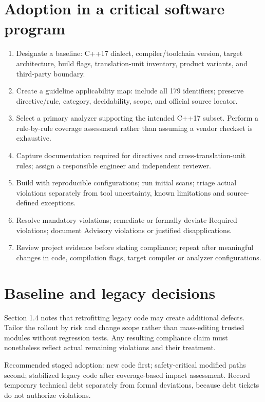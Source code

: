 \documentclass[10pt,letterpaper]{article}
\begin{document}
\section{Adoption in a critical software program}
\begin{enumerate}
\item Designate a baseline: C++17 dialect, compiler/toolchain version, target architecture, build flags, translation-unit inventory, product variants, and third-party boundary.
\item Create a guideline applicability map: include all 179 identifiers; preserve directive/rule, category, decidability, scope, and official source locator.
\item Select a primary analyzer supporting the intended C++17 subset. Perform a rule-by-rule coverage assessment rather than assuming a vendor checkset is exhaustive.
\item Capture documentation required for directives and cross-translation-unit rules; assign a responsible engineer and independent reviewer.
\item Build with reproducible configurations; run initial scans; triage actual violations separately from tool uncertainty, known limitations and source-defined exceptions.
\item Resolve mandatory violations; remediate or formally deviate Required violations; document Advisory violations or justified disapplications.
\item Review project evidence before stating compliance; repeat after meaningful changes in code, compilation flags, target compiler or analyzer configurations.
\end{enumerate}

\section{Baseline and legacy decisions}
Section 1.4 notes that retrofitting legacy code may create additional defects. Tailor the rollout by risk and change scope rather than mass-editing trusted modules without regression tests. Any resulting compliance claim must nonetheless reflect actual remaining violations and their treatment.

Recommended staged adoption: new code first; safety-critical modified paths second; stabilized legacy code after coverage-based impact assessment. Record temporary technical debt separately from formal deviations, because debt tickets do not authorize violations.
\end{document}
